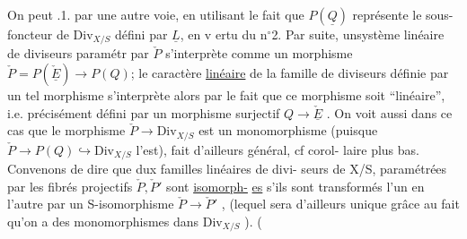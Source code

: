 On peut  \hand{\S}.1. par une autre voie, en utilisant le fait
que $P(\underline{Q})$ représente le  sous-foncteur de $\mathrm{Div}_{X/S}$ défini par
$\underline{L}$, en v ertu du n$^{\circ}$2. Par suite, unsystème linéaire de diviseurs paramétr
par $\check{P}$  s'interprète comme un morphisme $\check{P} = P(\check{\underline{E}})\longrightarrow P(Q)$; le caractère
\uline{linéaire} de la famille de diviseurs définie par un tel morphisme
s'interprète alors par le fait que ce morphisme soit ``linéaire'', i.e.
précisément défini par un morphisme surjectif $Q\longrightarrow\check{\underline{E}}$ . \hand{$\ulcorner$} On voit aussi
dans ce cas que le morphisme $\check{P}\longrightarrow\mathrm{Div}_{X/S}$ est un monomorphisme 
(puisque $\check{P}\longrightarrow P(Q)\hookrightarrow\mathrm{Div}_{X/S}$ l'est), fait d'ailleurs  général, cf corol-%
laire plus bas. Convenons  de dire que dux familles linéaires de divi-%
seurs de X/S, paramétrées par les fibrés projectifs $\check{P},\check{P}'$ sont \uline{isomorph-}%
\uline{es} s'ils sont transformés l'un en l'autre par un S-isomorphisme $\check{P}\longrightarrow\check{P}'$ ,
(lequel sera d'ailleurs unique grâce au fait qu'on a des monomorphismes
dans $\mathrm{Div}_{X/S}$ ). 
(

